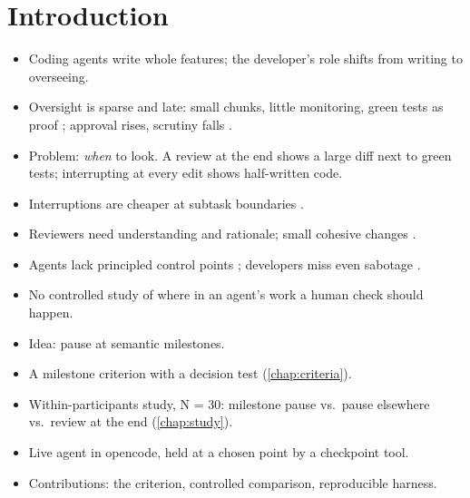 %
%
%


\chapter{Introduction}
\label{sec:introduction}

\begin{itemize}
  \item Coding agents write whole features; the developer's role shifts from writing to overseeing.
  \item Oversight is sparse and late: small chunks, little monitoring, green tests as proof \citep{dhanorkar_human_2026}; approval rises, scrutiny falls \citep{yu_habituation_2026}.
  \item Problem: \emph{when} to look. A review at the end shows a large diff next to green tests; interrupting at every edit shows half-written code.
\end{itemize}

\begin{itemize}
  \item Interruptions are cheaper at subtask boundaries \citep{iqbal_leveraging_2006,adamczyk_if_2004}.
  \item Reviewers need understanding and rationale; small cohesive changes \citep{bacchelli_expectations_2013,tao_how_2012,rigby_convergent_2013}.
  \item Agents lack principled control points \citep{wang_humans_2026}; developers miss even sabotage \citep{ye_coding_2026}.
  \item No controlled study of where in an agent's work a human check should happen.
\end{itemize}

\begin{itemize}
  \item Idea: pause at semantic milestones.
  \item A milestone criterion with a decision test (\autoref{chap:criteria}).
  \item Within-participants study, N = 30: milestone pause vs.\ pause elsewhere vs.\ review at the end (\autoref{chap:study}).
  \item Live agent in opencode, held at a chosen point by a checkpoint tool.
  \item Contributions: the criterion, controlled comparison, reproducible harness.
\end{itemize}

